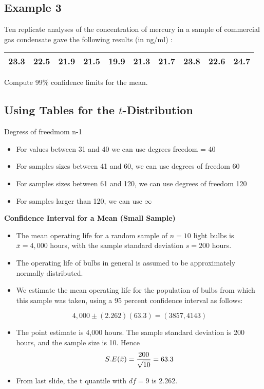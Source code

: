 \subsection{Example 3} Ten replicate analyses of the concentration
of mercury in a sample of commercial gas condensate gave the
following results (in ng/ml) :

\begin{tabular}{|c|c|c|c|c|c|c|c|c|c|}
\hline
23.3 & 22.5 & 21.9 & 21.5 & 19.9 & 21.3 & 21.7 & 23.8 & 22.6 &
24.7\\
\hline
\end{tabular}

Compute 99\% confidence limits for the mean.


\subsection{Using Tables for the $t$-Distribution}

Degress of freedmom n-1

\begin{itemize}
\item For values between 31 and 40 we can use degrees freedom = 40

\item For samples sizes between 41 and 60, we can use degrees of freedom 60

\item For samples sizes between 61 and 120, we can use degrees of freedom 120

\item For samples larger than 120, we can use $\infty$
\end{itemize}


\noindent \textbf{Confidence Interval for a Mean (Small Sample)}
\begin{itemize}
\item The mean operating life for a random sample of $n = 10$ light bulbs is $\bar{x} = 4,000$ hours, with the sample
standard deviation $s = 200$ hours. \item The operating life of bulbs in general is assumed to be approximately normally distributed.\item
We estimate the mean operating life for the population of bulbs from which this sample was taken, using a 95 percent
confidence interval as follows:

\[4,000\pm(2.262)(63.3)  = (3857,4143)\]

\item The point estimate is 4,000 hours. The sample standard deviation is 200 hours, and the sample size is 10. Hence \[S.E(\bar{x} ) = { 200 \over \sqrt{10}} = 63.3\]

\item From last slide, the t quantile with $df=9$ is 2.262.
\end{itemize}


